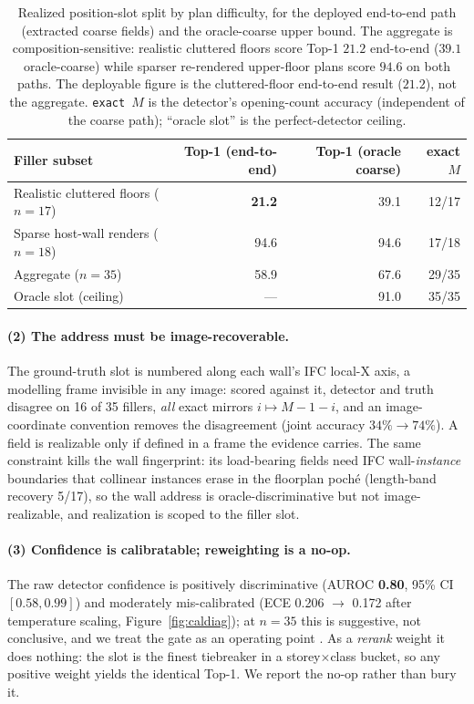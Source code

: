 \begin{table}[ht]
  \centering
  \small
  \begin{tabular}{lrrr}
    \toprule
    Filler subset & Top-1 (end-to-end) & Top-1 (oracle coarse) & exact $M$ \\
    \midrule
    Realistic cluttered floors ($n=17$) & \textbf{21.2} & 39.1 & 12/17 \\
    Sparse host-wall renders ($n=18$)   & 94.6 & 94.6 & 17/18 \\
    Aggregate ($n=35$)                  & 58.9 & 67.6 & 29/35 \\
    Oracle slot (ceiling)               & --- & 91.0 & 35/35 \\
    \bottomrule
  \end{tabular}
  \caption{Realized position-slot split by plan difficulty, for the deployed end-to-end path
  (extracted coarse fields) and the oracle-coarse upper bound. The aggregate is composition-sensitive:
  realistic cluttered floors score Top-1 $21.2$ end-to-end ($39.1$ oracle-coarse) while sparser
  re-rendered upper-floor plans score $94.6$ on both paths. The deployable figure is the
  cluttered-floor end-to-end result ($21.2$), not the aggregate. \texttt{exact $M$} is the detector's
  opening-count accuracy (independent of the coarse path); ``oracle slot'' is the perfect-detector
  ceiling.}
  \label{tab:split}
\end{table}

\paragraph{(2) The address must be image-recoverable.} The ground-truth slot is numbered along each
wall's IFC local-X axis, a modelling frame invisible in any image: scored against it, detector and
truth disagree on 16 of 35 fillers, \emph{all} exact mirrors $i \mapsto M{-}1{-}i$, and an
image-coordinate convention removes the disagreement (joint accuracy $34\% \to 74\%$). A field is
realizable only if defined in a frame the evidence carries. The same constraint kills the wall
fingerprint: its load-bearing fields need IFC wall-\emph{instance} boundaries that collinear instances
erase in the floorplan poch\'e (length-band recovery 5/17), so the wall address is
oracle-discriminative but not image-realizable, and realization is scoped to the filler slot.

\paragraph{(3) Confidence is calibratable; reweighting is a no-op.} The raw detector confidence is
positively discriminative (AUROC \textbf{0.80}, 95\% CI $[0.58, 0.99]$) and moderately mis-calibrated
(ECE 0.206 $\to$ 0.172 after temperature scaling, Figure~\ref{fig:caldiag}); at $n=35$ this is
suggestive, not conclusive, and we treat the gate as an operating point \citep{guo2017calibration}. As
a \emph{rerank} weight it does nothing: the slot is the finest tiebreaker in a storey$\times$class
bucket, so any positive weight yields the identical Top-1. We report the no-op rather than bury it.

